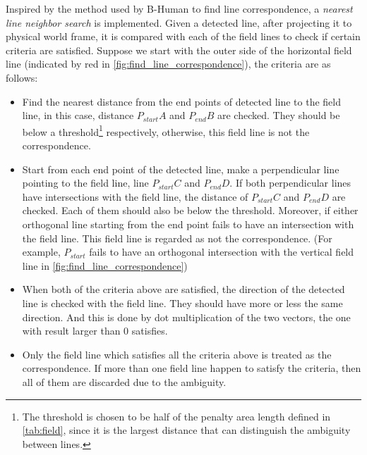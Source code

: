 Inspired by the method used by B-Human \cite{Bhuman} to find line correspondence, a \textit{nearest line neighbor search} is implemented. Given a detected line, after projecting it to physical world frame, it is compared with each of the field lines to check if certain criteria are satisfied. Suppose we start with the outer side of the horizontal field line (indicated by red in
\autoref{fig:find_line_correspondence}), the criteria are as follows:
\begin{itemize}
  \item Find the nearest distance from the end points of detected line to the field line, in this case, distance $P_{start}A$ and $P_{end}B$ are checked. They should be below a threshold\footnote{The threshold is chosen to be half of the penalty area length defined in \autoref{tab:field}, since it is the largest distance that can distinguish the ambiguity between lines.} respectively, otherwise, this field line is not the correspondence.
  \item Start from each end point of the detected line, make a perpendicular line pointing to the field line, \ie{} line $P_{start}C$ and $P_{end}D$. If both perpendicular lines have intersections with the field line, the distance of $P_{start}C$ and $P_{end}D$ are checked. Each of them should also be below the threshold. Moreover, if either orthogonal line starting from the end point fails to have an intersection with the field line. This field line is regarded as not the correspondence. (For example, $P_{start}$ fails to have an orthogonal intersection with the vertical field line in \autoref{fig:find_line_correspondence}) 
   \item When both of the criteria above are satisfied, the direction of the detected line is checked with the field line. They should have more or less the same direction. And this is done by dot multiplication of the two vectors, the one with result larger than 0 satisfies.
   \item Only the field line which satisfies all the criteria above is treated as the correspondence. If more than one field line happen to satisfy the criteria, then all of them are discarded due to the ambiguity.
\end{itemize}

